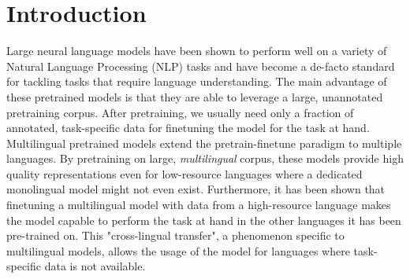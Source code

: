 
\chapter{Introduction}





Large neural language models have been shown to perform well on a variety of Natural Language Processing (NLP) tasks and have become a de-facto standard for tackling tasks that require language understanding. The main advantage of these pretrained models is that they are able to leverage a large, unannotated pretraining corpus. After pretraining, we usually need only a fraction of annotated, task-specific data for finetuning the model for the task at hand. \cite{devlin_bert_2019,radford_improving_nodate}  Multilingual pretrained models extend the pretrain-finetune paradigm to multiple languages. By pretraining on large, \textit{multilingual} corpus, these models provide high quality representations even for low-resource languages where a dedicated monolingual model might not even exist. Furthermore, it has been shown that finetuning a multilingual model with data from a high-resource language makes the model capable to perform the task at hand in the other languages it has been pre-trained on. This "cross-lingual transfer", a phenomenon specific to multilingual models, allows the usage of the model for languages where task-specific data is not available. \cite{k_cross-lingual_2022,conneau_unsupervised_2020-1}

